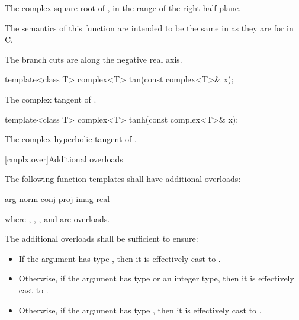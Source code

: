 \begin{itemdescr}
\pnum
\returns
The complex square root of , in the range of the right
half-plane.
\begin{note}
The semantics of this function are intended to be the same in \Cpp{}
as they are for  in C.
\end{note}

\pnum
\remarks
The branch cuts are along the negative real axis.
\end{itemdescr}

%
\begin{itemdecl}
template<class T> complex<T> tan(const complex<T>& x);
\end{itemdecl}

\begin{itemdescr}
\pnum
\returns
The complex tangent of .
\end{itemdescr}

%
\begin{itemdecl}
template<class T> complex<T> tanh(const complex<T>& x);
\end{itemdecl}

\begin{itemdescr}
\pnum
\returns
The complex hyperbolic tangent of .
\end{itemdescr}

[cmplx.over]{Additional overloads}

\pnum
{}%
%
%
%
%
The following function templates shall have additional overloads:
\begin{codeblock}
arg                   norm
conj                  proj
imag                  real
\end{codeblock}
where , , , and  are  overloads.

\pnum
{}%
The additional overloads shall be sufficient to ensure:
\begin{itemize}
        \item If the argument has type , then it is effectively
              cast to .
        \item Otherwise, if the argument has type  or an integer type,
              then it is effectively cast to .
        \item Otherwise, if the argument has type , then it is
              effectively cast to .
\end{itemize}

